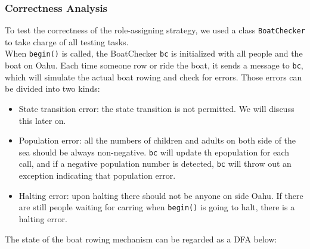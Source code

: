 \documentclass{article}
\begin{document}
\begin{spacing}{1.1}
\subsubsection{Correctness Analysis}
To test the correctness of the role-assigning strategy, we used a class \texttt{BoatChecker} to take charge of all testing tasks.\\
When \texttt{begin()} is called, the BoatChecker \texttt{bc} is initialized with all people and the boat on Oahu. Each time someone row or ride the boat, it sends a message to \texttt{bc}, which will simulate the actual boat rowing and check for errors. Those errors can be divided into two kinds:
\begin{itemize}
  \item State transition error: the state transition is not permitted. We will discuss this later on.\\
  \item Population error: all the numbers of children and adults on both side of the sea should be always non-negative. \texttt{bc} will update th epopulation for each call, and if a negative population number is detected, \texttt{bc} will throw out an exception indicating that population error.\\
  \item Halting error: upon halting there should not be anyone on side Oahu. If there are still people waiting for carring when \texttt{begin()} is going to halt, there is a halting error.\\
\end{itemize}
The state of the boat rowing mechanism can be regarded as a DFA below:\\
\begin{center}
\end{center}
\end{spacing}
\end{document}
